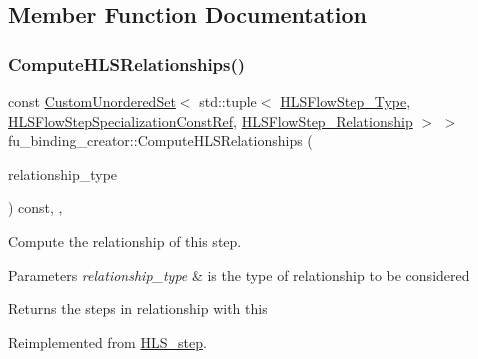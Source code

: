 \subsection{Member Function Documentation}
\mbox{\label{classfu__binding__creator_a9eb82db43be34dd0e60d85394c9e2f72}} 
\subsubsection{\texorpdfstring{Compute\+H\+L\+S\+Relationships()}{ComputeHLSRelationships()}}
{\footnotesize\ttfamily const \hyperlink{classCustomUnorderedSet}{Custom\+Unordered\+Set}$<$ std\+::tuple$<$ \hyperlink{hls__step_8hpp_ada16bc22905016180e26fc7e39537f8d}{H\+L\+S\+Flow\+Step\+\_\+\+Type}, \hyperlink{hls__step_8hpp_a5fdd2edf290c196531d21d68e13f0e74}{H\+L\+S\+Flow\+Step\+Specialization\+Const\+Ref}, \hyperlink{hls__step_8hpp_a3ad360b9b11e6bf0683d5562a0ceb169}{H\+L\+S\+Flow\+Step\+\_\+\+Relationship} $>$ $>$ fu\+\_\+binding\+\_\+creator\+::\+Compute\+H\+L\+S\+Relationships (\begin{DoxyParamCaption}\item[{const \hyperlink{classDesignFlowStep_a723a3baf19ff2ceb77bc13e099d0b1b7}{Design\+Flow\+Step\+::\+Relationship\+Type}}]{relationship\+\_\+type }\end{DoxyParamCaption}) const\hspace{0.3cm}{\ttfamily [override]}, {\ttfamily [protected]}, {\ttfamily [virtual]}}



Compute the relationship of this step. 


\begin{DoxyParams}{Parameters}
{\em relationship\+\_\+type} & is the type of relationship to be considered \\
\hline
\end{DoxyParams}
\begin{DoxyReturn}{Returns}
the steps in relationship with this 
\end{DoxyReturn}


Reimplemented from \hyperlink{classHLS__step_aed0ce8cca9a1ef18e705fc1032ad4de5}{H\+L\+S\+\_\+step}.



